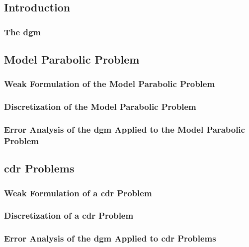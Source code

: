 \subsection{Introduction}

\begin{frame}
    \frametitle{The \acrfull{dgm}}

    
\end{frame}

\subsection{Model Parabolic Problem}

\begin{frame}
    \frametitle{Weak Formulation of the Model Parabolic Problem}

    
\end{frame}

\begin{frame}
    \frametitle{Discretization of the Model Parabolic Problem}

    
\end{frame}

\begin{frame}
    \frametitle{Error Analysis of the \acrshort{dgm} Applied to the Model Parabolic Problem}

    
\end{frame}

\subsection{\texorpdfstring{\acrlong{cdr}}{} Problems}

\begin{frame}
    \frametitle{Weak Formulation of a \acrfull{cdr} Problem}

    
\end{frame}

\begin{frame}
    \frametitle{Discretization of a \acrshort{cdr} Problem}

    
\end{frame}

\begin{frame}
    \frametitle{Error Analysis of the \acrshort{dgm} Applied to \acrshort{cdr} Problems}

    
\end{frame}